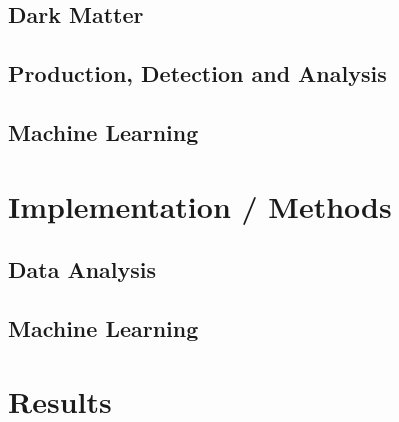 \documentclass[14pt, a4paper]{book}
\begin{document}
\chapter{Dark Matter}





\chapter{Production, Detection and Analysis}



\chapter{Machine Learning}


\part{Implementation / Methods}
\chapter{Data Analysis}


\chapter{Machine Learning}\label{chap:ML}


\part{Results}

\graphicspath{{figures/}}
\end{document}
